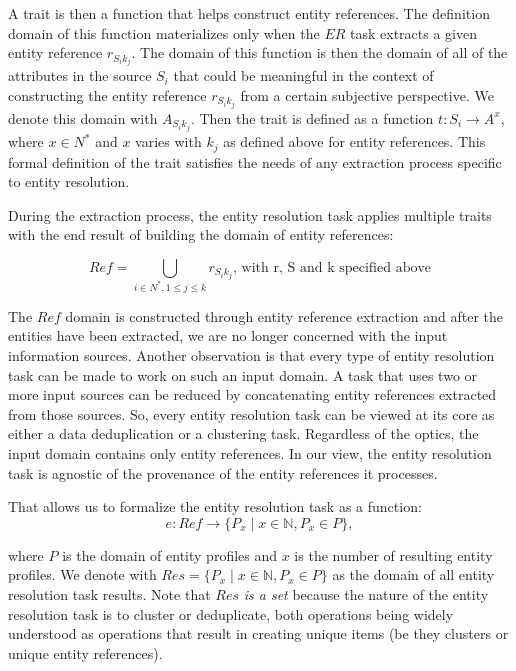 \documentclass[11pt]{article}
\begin{document}
    A trait is then a function that helps construct entity references.
    The definition domain of this function materializes only when the $ER$ task
    extracts a given entity reference $r_{{S_i}{k_j}}$.
    The domain of this function is then the domain of all of the attributes in
    the source $S_i$ that could be meaningful in the context of constructing the
    entity reference $r_{{S_i}{k_j}}$ from a certain subjective perspective.
    We denote this domain with $A_{{S_i}{k_j}}$.
    Then the trait is defined as a function $t: S_i \rightarrow A^x$, where
    $x \in N^*$ and $x$ varies with $k_j$ as defined above for entity
    references.
    This formal definition of the trait satisfies the needs of any extraction
    process specific to entity resolution.

    During the extraction process, the entity resolution task applies multiple
    traits with the end result of building the domain of entity references:

    \[
        Ref = \bigcup_{i \in N^*,1 \leq j \leq k} r_{{S_i}{k_j}}
        \textrm{, with r, S and k specified above}
    \]

    The $Ref$ domain is constructed through entity reference extraction and
    after the entities have been extracted, we are no longer concerned with the
    input information sources.
    Another observation is that every type of entity resolution task can be made
    to work on such an input domain\cite{Pap19}.
    A task that uses two or more input sources can be reduced by concatenating
    entity references extracted from those sources.
    So, every entity resolution task can be viewed at its core as either a
    data deduplication or a clustering task.
    Regardless of the optics, the input domain contains only entity references.
    In our view, the entity resolution task is agnostic of the provenance of the
    entity references it processes.
    
    That allows us to formalize the entity resolution task as a function:
    \[
        e : Ref \rightarrow \{P_x \mid x \in \mathbb{N}, P_x \in P \},
    \]
    
    where $P$ is the domain of entity profiles and $x$ is the number of
    resulting entity profiles.
    We denote with $Res=\{P_x \mid x \in \mathbb{N}, P_x \in P\}$ as the domain
    of all entity resolution task results.
    Note that $Res$ \textit{is a set} because the nature of the entity
    resolution task is to cluster or deduplicate, both operations being widely
    understood as operations that result in creating unique items (be they
    clusters or unique entity references).
\end{document}
